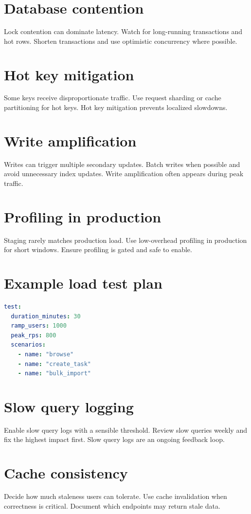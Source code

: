 \section{Database contention}
Lock contention can dominate latency.
Watch for long-running transactions and hot rows.
Shorten transactions and use optimistic concurrency where possible.

\section{Hot key mitigation}
Some keys receive disproportionate traffic.
Use request sharding or cache partitioning for hot keys.
Hot key mitigation prevents localized slowdowns.

\section{Write amplification}
Writes can trigger multiple secondary updates.
Batch writes when possible and avoid unnecessary index updates.
Write amplification often appears during peak traffic.

\section{Profiling in production}
Staging rarely matches production load.
Use low-overhead profiling in production for short windows.
Ensure profiling is gated and safe to enable.

\section{Example load test plan}
\begin{lstlisting}[language=YAML]
test:
  duration_minutes: 30
  ramp_users: 1000
  peak_rps: 800
  scenarios:
    - name: "browse"
    - name: "create_task"
    - name: "bulk_import"
\end{lstlisting}

\section{Slow query logging}
Enable slow query logs with a sensible threshold.
Review slow queries weekly and fix the highest impact first.
Slow query logs are an ongoing feedback loop.

\section{Cache consistency}
Decide how much staleness users can tolerate.
Use cache invalidation when correctness is critical.
Document which endpoints may return stale data.

